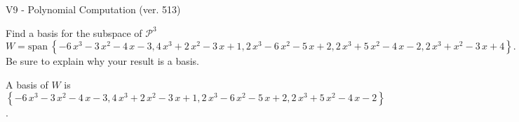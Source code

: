 \begin{exercise}
  \begin{exerciseTitle}V9 - Polynomial Computation (ver. 513)\end{exerciseTitle}
  \begin{exerciseStatement}
    Find a basis for the subspace of \(\mathcal{P}^3\) 
\[W=\mathrm{span}\ \left\{-6 \, x^{3} - 3 \, x^{2} - 4 \, x - 3 , 4 \, x^{3} + 2 \, x^{2} - 3 \, x + 1 , 2 \, x^{3} - 6 \, x^{2} - 5 \, x + 2 , 2 \, x^{3} + 5 \, x^{2} - 4 \, x - 2 , 2 \, x^{3} + x^{2} - 3 \, x + 4\right\}.\]
 Be sure to explain why your result is a basis.


  \end{exerciseStatement}
  \begin{exerciseAnswer}
   A basis of \(W\) is  \(\left\{-6 \, x^{3} - 3 \, x^{2} - 4 \, x - 3 , 4 \, x^{3} + 2 \, x^{2} - 3 \, x + 1 , 2 \, x^{3} - 6 \, x^{2} - 5 \, x + 2 , 2 \, x^{3} + 5 \, x^{2} - 4 \, x - 2\right\}\).
  


  \end{exerciseAnswer}
\end{exercise}